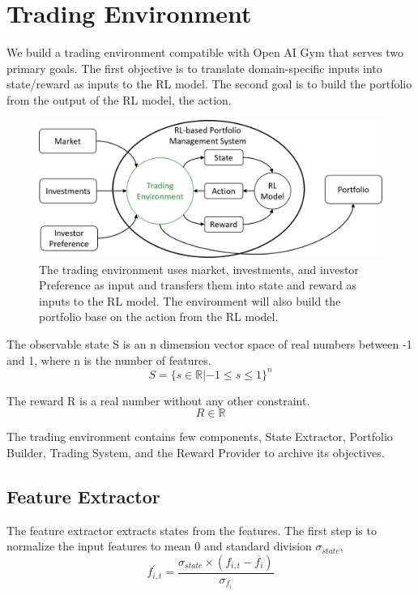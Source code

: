 \section{Trading Environment}
We build a trading environment compatible with Open AI Gym \cite{brockman2016openai} that serves two primary goals. The first objective is to translate domain-specific inputs into state/reward as inputs to the RL model. The second goal is to build the portfolio from the output of the RL model, the action.
\begin{figure}[ht]
  \includegraphics[width=15cm]{images/trading_environment.png}
  \caption[Trading Environment] { The trading environment uses market, investments, and investor Preference as input and transfers them into state and reward as inputs to the RL model. The environment will also build the portfolio base on the action from the RL model.}
  \label{fig:trading_environment} 
\end{figure}
\par
The observable state S is an n dimension vector space of real numbers between -1 and 1, where n is the number of features.
\[
    S = \{ {s \in \mathbb{R} | -1 \leq s \leq 1 } \} ^n
\]

\par
The reward R is a real number without any other constraint.
\[
    R \in \mathbb{R}
\]

\par
The trading environment contains few components, State Extractor, Portfolio Builder, Trading System, and the Reward Provider to archive its objectives.

\subsection {Feature Extractor}
The feature extractor extracts states from the features. 
The first step is to normalize the input features to mean 0 and standard division \(\sigma_{state}\),
\[
    f^{'}_{i,t} = \frac{\sigma_{state} \times   (f_{i,t} -  \overline{f_i})}{\sigma_{f_i}}
\]

